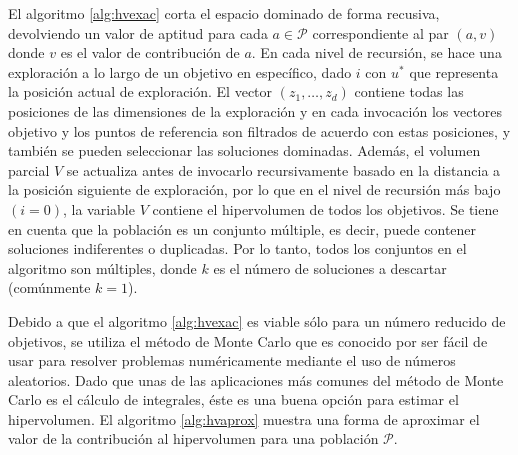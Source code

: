 El algoritmo \ref{alg:hvexac} corta el espacio dominado de forma recusiva, devolviendo un valor de 
aptitud para cada $a \in \mathcal{P}$ correspondiente al par $\left(a, v\right)$ donde $v$ es el valor de contribuci\'on de $a$. 
En cada nivel de recursi\'on, se hace una exploraci\'on a lo largo de un objetivo en espec\'ifico, dado $i$ con $u^{*}$ que 
representa la posici\'on actual de exploraci\'on. El vector $\left(z_1,\ldots, z_d \right)$ contiene todas las posiciones de las 
dimensiones de la exploraci\'on y en cada invocaci\'on los vectores objetivo y los puntos de referencia son filtrados de acuerdo 
con estas posiciones, y tambi\'en se pueden seleccionar las soluciones dominadas. Adem\'as, el volumen parcial $V$ se actualiza 
antes de invocarlo recursivamente basado en la distancia a la posici\'on siguiente de exploraci\'on, por lo que en el nivel de 
recursi\'on m\'as bajo $\left(i = 0\right)$, la variable $V$ contiene el hipervolumen de todos los objetivos. Se tiene en cuenta que 
la poblaci\'on es un conjunto m\'ultiple, es decir, puede contener soluciones indiferentes o duplicadas. Por lo tanto, todos los 
conjuntos en el algoritmo son m\'ultiples, donde $k$ es el n\'umero de soluciones a descartar (com\'unmente $k=1$).

Debido a que el algoritmo \ref{alg:hvexac} es viable s\'olo para un n\'umero reducido de objetivos, se utiliza el m\'etodo de Monte 
Carlo que es conocido por ser f\'acil de usar para resolver problemas num\'ericamente mediante el uso de n\'umeros aleatorios. Dado 
que unas de las aplicaciones m\'as comunes del m\'etodo de Monte Carlo es el c\'alculo de integrales, \'este es una 
buena opci\'on para estimar el hipervolumen. El algoritmo \ref{alg:hvaprox} muestra una forma de aproximar el 
valor de la contribuci\'on al hipervolumen para una poblaci\'on $\mathcal{P}$.

